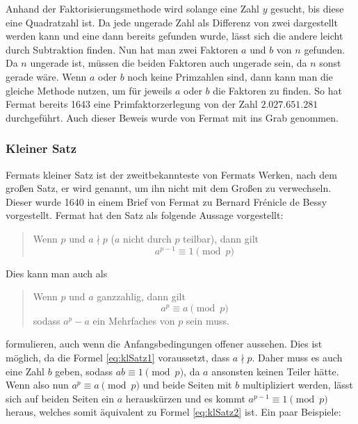 Anhand der Faktorisierungsmethode wird solange eine Zahl $y$ gesucht, bis diese eine \Gls{Quadratzahl} ist. Da jede ungerade Zahl als Differenz von zwei  dargestellt werden kann und eine dann bereits gefunden wurde, lässt sich die andere leicht durch Subtraktion finden. Nun hat man zwei Faktoren $a$ und $b$ von $n$ gefunden. Da $n$ ungerade ist, müssen die beiden Faktoren auch ungerade sein, da $n$ sonst gerade wäre. Wenn $a$ oder $b$ noch keine Primzahlen sind, dann kann man die gleiche Methode nutzen, um für jeweils $a$ oder $b$ die Faktoren zu finden. So hat Fermat bereits 1643 eine Primfaktorzerlegung von der Zahl $2.027.651.281$ durchgeführt. Auch dieser Beweis wurde von Fermat mit ins Grab genommen.

\subsubsection{Kleiner Satz} \label{sec:klSatz}
Fermats kleiner Satz ist der zweitbekannteste von Fermats Werken, nach dem großen Satz, er wird  genannt, um ihn nicht mit dem Großen zu verwechseln. Dieser wurde 1640 in einem Brief von Fermat zu Bernard Frénicle de Bessy vorgestellt. Fermat hat den Satz als folgende Aussage vorgestellt:

\begin{quote}
    Wenn $p$  und $a \nmid p$ ($a$ nicht durch $p$ teilbar), dann gilt
    \begin{equation} \label{eq:klSatz1}
        a^{p-1} \equiv 1 \pmod{p}
    \end{equation}
\end{quote}

\noindent Dies kann man auch als

\begin{quote}
    Wenn $p$  und $a$ ganzzahlig, dann gilt
    \begin{equation} \label{eq:klSatz2}
        a^p \equiv a \pmod{p}
    \end{equation}
    sodass $a^p - a$ ein Mehrfaches von $p$ sein muss.
\end{quote}

\noindent formulieren, auch wenn die Anfangsbedingungen offener aussehen. Dies ist möglich, da die Formel \ref{eq:klSatz1} voraussetzt, dass $a \nmid p$. Daher muss es auch eine Zahl $b$ geben, sodass $ab \equiv 1 \pmod{p}$, da $a$ ansonsten keinen Teiler hätte. Wenn also nun $a^p \equiv a \pmod{p}$ und beide Seiten mit $b$ multipliziert werden, lässt sich auf beiden Seiten ein $a$ herauskürzen und es kommt $a^{p-1} \equiv 1 \pmod{p}$ heraus, welches somit äquivalent zu Formel \ref{eq:klSatz2} ist. Ein paar Beispiele:

